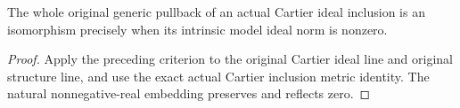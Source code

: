 \begin{corollary}
\label{cor:actual-cartier-ideal-nonzero-generic-inclusion}
\leanok
{}
The whole original generic pullback of an actual Cartier ideal
inclusion is an isomorphism precisely when its intrinsic model
ideal norm is nonzero.
\end{corollary}
\begin{proof}
Apply the preceding criterion to the original Cartier ideal line
and original structure line, and use the exact actual Cartier
inclusion metric identity. The natural nonnegative-real embedding
preserves and reflects zero.
\end{proof}
